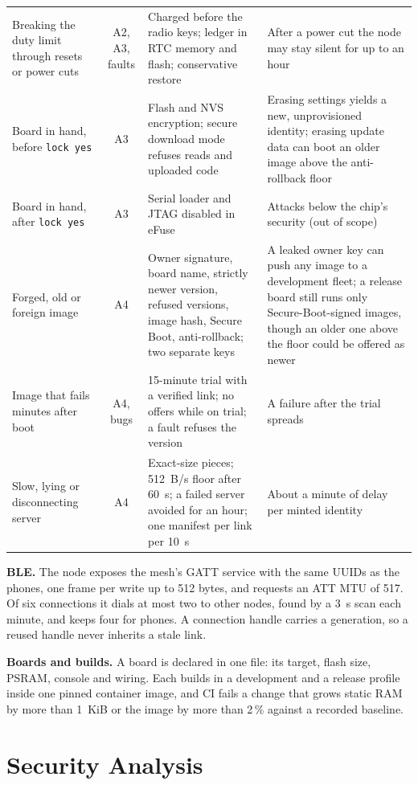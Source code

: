 \documentclass[conference]{IEEEtran}
\newcommand{\code}[1]{\texttt{#1}}
\begin{document}
\begin{table}[t]
\begin{tabular}{@{}L{3.5cm}cL{6.5cm}L{5.4cm}@{}}
Breaking the duty limit through resets or power cuts & A2, A3, faults & Charged before the radio keys; ledger in RTC memory and flash; conservative restore & After a power cut the node may stay silent for up to an hour \\
Board in hand, before \code{lock yes} & A3 & Flash and NVS encryption; secure download mode refuses reads and uploaded code & Erasing settings yields a new, unprovisioned identity; erasing update data can boot an older image above the anti-rollback floor \\
Board in hand, after \code{lock yes} & A3 & Serial loader and JTAG disabled in eFuse & Attacks below the chip's security (out of scope) \\
Forged, old or foreign image & A4 & Owner signature, board name, strictly newer version, refused versions, image hash, Secure Boot, anti-rollback; two separate keys & A leaked owner key can push any image to a development fleet; a release board still runs only Secure-Boot-signed images, though an older one above the floor could be offered as newer \\
Image that fails minutes after boot & A4, bugs & 15-minute trial with a verified link; no offers while on trial; a fault refuses the version & A failure after the trial spreads \\
Slow, lying or disconnecting server & A4 & Exact-size pieces; 512~B/s floor after 60~s; a failed server avoided for an hour; one manifest per link per 10~s & About a minute of delay per minted identity \\
\bottomrule
\end{tabular}
\end{table}

\textbf{BLE.} The node exposes the mesh's GATT service with the same UUIDs as the phones, one frame per write up to 512 bytes, and requests an ATT MTU of 517. Of six connections it dials at most two to other nodes, found by a 3~s scan each minute, and keeps four for phones. A connection handle carries a generation, so a reused handle never inherits a stale link.

\textbf{Boards and builds.} A board is declared in one file: its target, flash size, PSRAM, console and wiring. Each builds in a development and a release profile inside one pinned container image, and CI fails a change that grows static RAM by more than 1~KiB or the image by more than 2\,\% against a recorded baseline.

\section{Security Analysis}
\label{sec:security}
\end{document}
